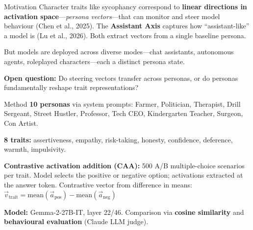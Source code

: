 \documentclass[a1paper]{article}
\newcommand{\bodysize}{\fontsize{24}{25}\selectfont\color{eracharcoal}}
\begin{document}
\noindent
\begin{minipage}[t]{0.485\textwidth}
\begin{posterblock}[equal height group=row1]{Motivation}
\bodysize
Character traits like sycophancy correspond to \textbf{linear directions in activation space}---\emph{persona vectors}---that can monitor and steer model behaviour (Chen et al., 2025). The \textbf{Assistant Axis} captures how ``assistant-like'' a model is (Lu et al., 2026). Both extract vectors from a single baseline persona.

\smallskip
But models are deployed across diverse modes---chat assistants, autonomous agents, roleplayed characters---each a distinct persona state.

\smallskip
\vspace{8mm}
{\color{eracrimson}\textbf{Open question:}} Do steering vectors transfer across personas, or do personas fundamentally reshape trait representations?
\end{posterblock}
\end{minipage}\hfill
\begin{minipage}[t]{0.505\textwidth}
\begin{posterblock}[equal height group=row1]{Method}
\bodysize
\textbf{10 personas} via system prompts: Farmer, Politician, Therapist, Drill Sergeant, Street Hustler, Professor, Tech CEO, Kindergarten Teacher, Surgeon, Con Artist.

\smallskip
\textbf{8 traits:} assertiveness, empathy, risk-taking, honesty, confidence, deference, warmth, impulsivity.

\smallskip
\textbf{Contrastive activation addition (CAA):}\footnotemark{} 500 A/B multiple-choice scenarios per trait. Model selects the positive or negative option; activations extracted at the answer token. Contrastive vector from difference in means:
$\vec{v}_{\text{trait}} = \text{mean}(\vec{a}_{\text{pos}}) - \text{mean}(\vec{a}_{\text{neg}})$

\smallskip
\textbf{Model:} Gemma-2-27B-IT, layer 22/46. Comparison via \textbf{cosine similarity} and \textbf{behavioural evaluation} (Claude LLM judge).
\end{posterblock}
\end{minipage}
\end{document}
